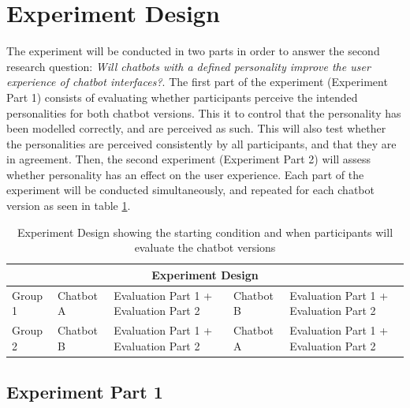 \vspace{5mm} %
    
\section{Experiment Design}

The experiment will be conducted in two parts in order to answer the second research question: \textit{Will chatbots with a defined personality improve the user experience of chatbot interfaces?}. The first part of the experiment (Experiment Part 1) consists of evaluating whether participants perceive the intended personalities for both chatbot versions. This it to control that the personality has been modelled correctly, and are perceived as such. This will also test whether the personalities are perceived consistently by all participants, and that they are in agreement. Then, the second experiment (Experiment Part 2) will assess whether personality has an effect on the user experience. Each part of the experiment will be conducted simultaneously, and repeated for each chatbot version as seen in table \ref{table:expdes}.

\vspace{2,5mm}

  \begin{table}[h]
  \centering
    \begin{tabular}{ |p{}||p{}||p{4cm}||p{}||p{4cm}| }
    \hline
    \multicolumn{5}{|c|}{Experiment Design} \\
    \hline
    Group 1 &   Chatbot A & Evaluation Part 1 + Evaluation Part 2 & Chatbot B & Evaluation Part 1 + Evaluation Part 2 \\
    \hline   
    Group 2 &   Chatbot B & Evaluation Part 1 + Evaluation Part 2 & Chatbot A & Evaluation Part 1 + Evaluation Part 2 \\
    \hline
    \end{tabular}
    \caption{Experiment Design showing the starting condition and when participants will evaluate the chatbot versions}
    \label{table:expdes}
    \end{table}
    
\vspace{2,5mm}

\subsection{Experiment Part 1}

\vspace{2,5mm}

